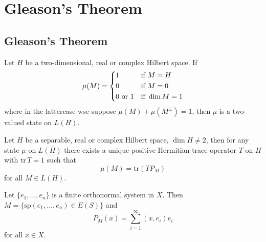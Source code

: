 \chapter{Gleason's Theorem}

\section{Gleason's Theorem}

\begin{example}
    Let \(H\) be a two-dimensional, real or complex Hilbert space. If
    \[
    \mu(M)=\begin{dcases}
        1 & \mbox{if } M=H\\
        0 & \mbox{if } M={0}\\
        0 \mbox{ or } 1 & \mbox{if } \dim M =1
    \end{dcases}
    \]
    where in the lattercase wse suppose \(\mu(M)+\mu(M^\perp)=1\), then \(\mu\) is a two-valued state on \(L(H)\). \cite[Example 3.1.1]{MR1256736}
\end{example}

\begin{theorem}
Let \(H\) be a separable, real or complex Hilbert space, \(\dim H \neq 2\), then for any state \(\mu\) on \(L(H)\) there exists a unique positive Hermitian trace operator \(T\) on \(H\) with \(\mathrm{tr}\, T =1\) such that
\[\mu(M) = \mathrm{tr}(TP_M)\]
for all \(M \in L(H)\).
\begin{proposition}
    Let \(\{e_1,\dots,e_n\}\) is a finite orthonormal system in \(X\). Then \(M=\{\mathrm{sp}(e_1,\dots,e_n) \in E(S)\}\) and
    \[P_M(x) = \sum_{i=1}^{\infty} (x,e_i)e_i\]
    for all \(x \in X\).
\end{proposition}
\end{theorem}